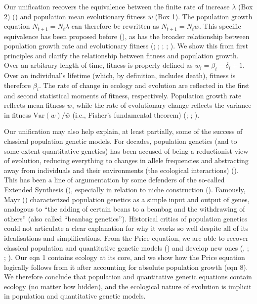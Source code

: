 \documentclass[
]{article}
\begin{document}
Our unification recovers the equivalence between the finite rate of
increase \(\lambda\) (Box 2) ()
and population mean evolutionary fitness \(\bar{w}\) (Box 1). The
population growth equation \(N_{t+1} = N_{t}\lambda\) can therefore be
rewritten as \(N_{t+1} = N_{t}\bar{w}\). This specific equivalence has
been proposed before (), as has the
broader relationship between population growth rate and evolutionary
fitness (;
;
; ; ). We show this from first
principles and clarify the relationship between fitness and population
growth. Over an arbitrary length of time, fitness is properly defined as
\(w_{i} = \beta_{i} - \delta_{i} + 1\). Over an individual's lifetime
(which, by definition, includes death), fitness is therefore
\(\beta_{i}\). The rate of change in ecology and evolution are reflected
in the first and second statistical moments of fitness, respectively.
Population growth rate reflects mean fitness \(\bar{w}\), while the rate
of evolutionary change reflects the variance in fitness
\(\mathrm{Var}(w)/\bar{w}\) (i.e., Fisher's fundamental theorem)
(; ; ).

Our unification may also help explain, at least partially, some of the
success of classical population genetic models. For decades, population
genetics (and to some extent quantitative genetics) has been accused of
being a reductionist view of evolution, reducing everything to changes
in allele frequencies and abstracting away from individuals and their
environments (the ecological interactions)
(). This has been a line of
argumentation by some defenders of the so-called Extended Synthesis
(), especially in relation
to niche construction (). Famously, Mayr () characterized
population genetics as a simple input and output of genes, analogous to
``the adding of certain beans to a beanbag and the withdrawing of
others'' (also called ``beanbag genetics''). Historical critics of
population genetics could not articulate a clear explanation for why it
works so well despite all of its idealisations and simplifications. From
the Price equation, we are able to recover classical population and
quantitative genetic models ()
and develop new ones (,
; ;
). Our eqn 1 contains ecology at its
core, and we show how the Price equation logically follows from it after
accounting for absolute population growth (eqn 8). We therefore conclude
that population and quantitative genetic equations contain ecology (no
matter how hidden), and the ecological nature of evolution is implicit
in population and quantitative genetic models.
\end{document}
